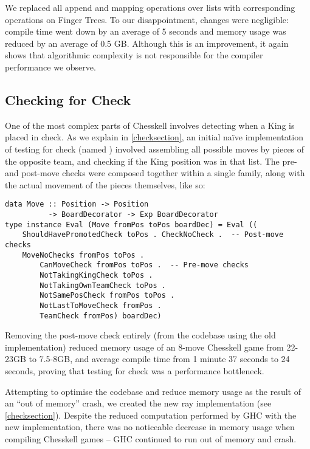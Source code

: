 We replaced all append and mapping operations over lists with corresponding operations on Finger Trees. To our disappointment, changes were negligible: compile time went down by an average of 5 seconds and memory usage was reduced by an average of 0.5 GB. Although this is an improvement, it again shows that algorithmic complexity is not responsible for the compiler performance we observe.

\subsection{Checking for Check}

One of the most complex parts of Chesskell involves detecting when a King is placed in check. As we explain in \cref{checksection}, an initial na\"ive implementation of testing for check (named ) involved assembling all possible moves by pieces of the opposite team, and checking if the King position was in that list. The pre- and post-move checks were composed together within a single family, along with the actual movement of the pieces themselves, like so:

\begin{lstlisting}
data Move :: Position -> Position
          -> BoardDecorator -> Exp BoardDecorator
type instance Eval (Move fromPos toPos boardDec) = Eval ((
    ShouldHavePromotedCheck toPos . CheckNoCheck .  -- Post-move checks
    MoveNoChecks fromPos toPos .
        CanMoveCheck fromPos toPos .  -- Pre-move checks
        NotTakingKingCheck toPos .
        NotTakingOwnTeamCheck toPos .
        NotSamePosCheck fromPos toPos .
        NotLastToMoveCheck fromPos .
        TeamCheck fromPos) boardDec)
\end{lstlisting}

Removing the  post-move check entirely (from the codebase using the old implementation) reduced memory usage of an 8-move Chesskell game from 22-23GB to 7.5-8GB, and average compile time from 1 minute 37 seconds to 24 seconds, proving that testing for check was a performance bottleneck.

Attempting to optimise the codebase and reduce memory usage as the result of an ``out of memory'' crash, we created the new ray implementation (see \cref{checksection}). Despite the reduced computation performed by GHC with the new implementation, there was no noticeable decrease in memory usage when compiling Chesskell games -- GHC continued to run out of memory and crash.

